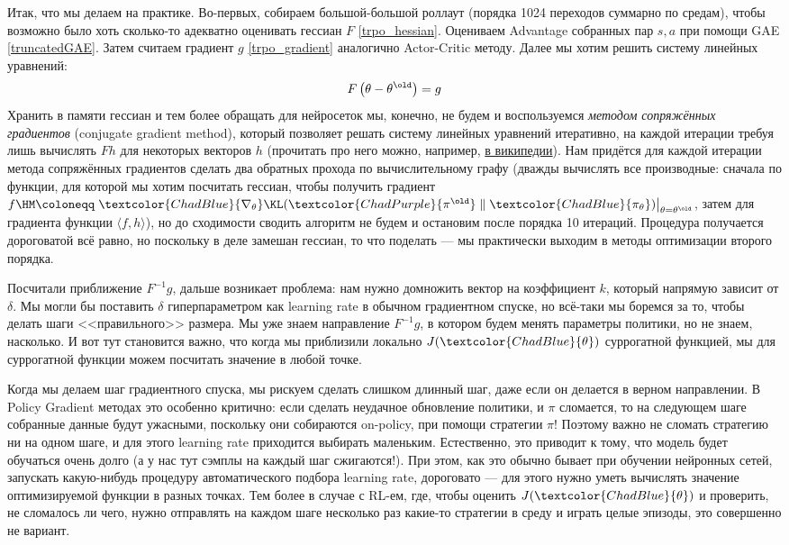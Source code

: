 Итак, что мы делаем на практике. Во-первых, собираем большой-большой роллаут (порядка 1024 переходов суммарно по средам), чтобы возможно было хоть сколько-то адекватно оценивать гессиан $F$ \eqref{trpo_hessian}. Оцениваем Advantage собранных пар $s, a$ при помощи GAE \eqref{truncatedGAE}. Затем считаем градиент $g$ \eqref{trpo_gradient} аналогично Actor-Critic методу. Далее мы хотим решить систему линейных уравнений:
$$F \left(\theta - \theta^{\old}\right) = g$$
Хранить в памяти гессиан и тем более обращать для нейросеток мы, конечно, не будем и воспользуемся \emph{методом сопряжённых градиентов} (conjugate gradient method), который позволяет решать систему линейных уравнений итеративно, на каждой итерации требуя лишь вычислять $Fh$ для некоторых векторов $h$ (прочитать про него можно, например, \href{https://ru.wikipedia.org/wiki/Метод_сопряжённых_градиентов_(для_решения_СЛАУ)}{в википедии}). Нам придётся для каждой итерации метода сопряжённых градиентов сделать два обратных прохода по вычислительному графу (дважды вычислять все производные: сначала по функции, для которой мы хотим посчитать гессиан, чтобы получить градиент $f \HM \coloneqq \left. \textcolor{ChadBlue}{\nabla_\theta} \KL(\textcolor{ChadPurple}{\pi^{\old}} \parallel \textcolor{ChadBlue}{\pi_\theta}) \right|_{\theta = \theta^{\old}}$, затем для градиента функции $\langle f, h \rangle$), но до сходимости сводить алгоритм не будем и остановим после порядка 10 итераций. Процедура получается дороговатой всё равно, но поскольку в деле замешан гессиан, то что поделать --- мы практически выходим в методы оптимизации второго порядка.

Посчитали приближение $F^{-1}g$, дальше возникает проблема: нам нужно домножить вектор на коэффициент $k$, который напрямую зависит от $\delta$. Мы могли бы поставить $\delta$ гиперпараметром как learning rate в обычном градиентном спуске, но всё-таки мы боремся за то, чтобы делать шаги <<правильного>> размера. Мы уже знаем направление $F^{-1}g$, в котором будем менять параметры политики, но не знаем, насколько. И вот тут становится важно, что когда мы приблизили локально $J(\textcolor{ChadBlue}{\theta})$ суррогатной функцией, мы для суррогатной функции можем посчитать значение в любой точке.

Когда мы делаем шаг градиентного спуска, мы рискуем сделать слишком длинный шаг, даже если он делается в верном направлении. В Policy Gradient методах это особенно критично: если сделать неудачное обновление политики, и $\pi$ сломается, то на следующем шаге собранные данные будут ужасными, поскольку они собираются on-policy, при помощи стратегии $\pi$! Поэтому важно не сломать стратегию ни на одном шаге, и для этого learning rate приходится выбирать маленьким. Естественно, это приводит к тому, что модель будет обучаться очень долго (а у нас тут сэмплы на каждый шаг сжигаются!). При этом, как это обычно бывает при обучении нейронных сетей, запускать какую-нибудь процедуру автоматического подбора learning rate, дороговато --- для этого нужно уметь вычислять значение оптимизируемой функции в разных точках. Тем более в случае с RL-ем, где, чтобы оценить $J(\textcolor{ChadBlue}{\theta})$ и проверить, не сломалось ли чего, нужно отправлять на каждом шаге несколько раз какие-то стратегии в среду и играть целые эпизоды, это совершенно не вариант.


